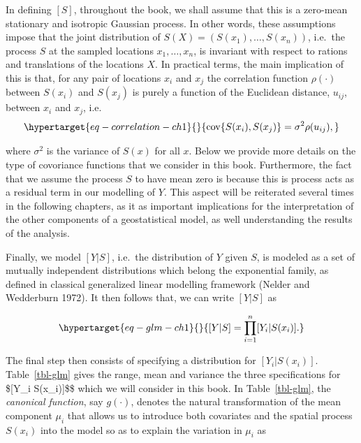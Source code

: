 \documentclass[
  letterpaper,
]{krantz}
\begin{document}
In defining \([S]\), throughout the book, we shall assume that this is a
zero-mean stationary and isotropic Gaussian process. In other words,
these assumptions impose that the joint distribution of
\(S(X) = (S(x_1),\ldots,S(x_n))\), i.e.~the process \(S\) at the sampled
locations \(x_1, \ldots, x_n\), is invariant with respect to rations and
translations of the locations \(X\). In practical terms, the main
implication of this is that, for any pair of locations \(x_i\) and
\(x_j\) the correlation function \(\rho(\cdot)\) between \(S(x_i)\) and
\(S(x_j)\) is purely a function of the Euclidean distance, \(u_{ij}\),
between \(x_i\) and \(x_j\),
i.e.~\begin{equation}\protect\hypertarget{eq-correlation-ch1}{}{
{\rm cov}\{S(x_i), S(x_j)\} = \sigma^2\rho(u_{ij}),
}\label{eq-correlation-ch1}\end{equation}

where \(\sigma^2\) is the variance of \(S(x)\) for all \(x\). Below we
provide more details on the type of covoriance functions that we
consider in this book. Furthermore, the fact that we assume the process
\(S\) to have mean zero is because this is process acts as a residual
term in our modelling of \(Y\). This aspect will be reiterated several
times in the following chapters, as it as important implications for the
interpretation of the other components of a geostatistical model, as
well understanding the results of the analysis.

Finally, we model \([Y | S]\), i.e.~the distribution of \(Y\) given
\(S\), is modeled as a set of mutually independent distributions which
belong the exponential family, as defined in classical generalized
linear modelling framework (Nelder and Wedderburn 1972). It then follows
that, we can write \([Y | S]\) as

\begin{equation}\protect\hypertarget{eq-glm-ch1}{}{
[Y | S] = \prod_{i=1}^n [Y_i | S(x_i)].
}\label{eq-glm-ch1}\end{equation}

The final step then consists of specifying a distribution for
\([Y_i | S(x_i)]\). Table~\ref{tbl-glm} gives the range, mean and
variance the three specifications for \${[}Y\_i \textbar{}
S(x\_i){]}\$\$ which we will consider in this book. In
Table~\ref{tbl-glm}, the \emph{canonical function}, say \(g(\cdot)\),
denotes the natural transformation of the mean component \(\mu_i\) that
allows us to introduce both covariates and the spatial process
\(S(x_i)\) into the model so as to explain the variation in \(\mu_i\) as
\end{document}
